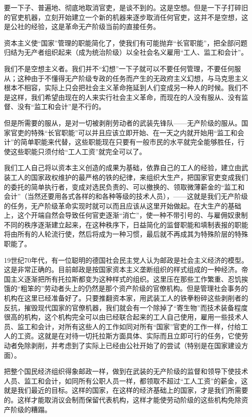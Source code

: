 \documentclass[UTF8, 12pt, a4paper]{ctexrep}
\begin{document}
要一下子、普遍地、彻底地取消官吏，是谈不到的。这是空想。但是一下子打碎旧的官吏机器，立刻开始建立一个新的机器来逐步取消任何官吏，这并不是空想，这是公社的经验，这是革命无产阶级当前的直接任务。

资本主义使“国家”管理的职能简化了，使我们有可能抛弃“长官职能”，把全部问题归结为无产者组织起来（成为统治阶级）以全社会名义雇用“工人、监工和会计”。

我们不是空想主义者。我们并不“幻想”一下子就可以不要任何管理，不要任何服从；这种由于不懂得无产阶级专政的任务而产生的无政府主义幻想，与马克思主义根本不相容，实际上只会把社会主义革命拖延到人们变成另一种人的时候。我们不是这样，我们希望由现在的人来实行社会主义革命，而现在的人没有服从、没有监督、没有“监工和会计”是不行的。

但是所需要的服从，是对一切被剥削劳动者的武装先锋队——无产阶级的服从。国家官吏的特殊“长官职能”可以并且应该立即开始、在一天之内就开始用“监工和会计”的简单职能来代替，这些职能现在只要有一般市民的水平就完全能够胜任，行使这些职能只须付给“工人工资”就完全可以了。

我们工人自己将以资本主义创造的成果为基础，依靠自己的工人的经验，建立由武装工人的国家政权维护的最严格的铁的纪律，来组织大生产，把国家官吏变成我们的委托的简单执行者，变成对选民负责的、可以撤换的、领取微薄薪金的“监工和会计”（当然还要用各式各样的和各种等级的技术人员），——这就是我们无产阶级的任务，无产阶级革命实现时就可以而且应该从这里开始做起。在大生产的基础上，这个开端自然会导致任何官吏逐渐“消亡”，使一种不带引号的、与雇佣奴隶制不同的秩序逐渐建立起来，在这种秩序下，日益简化的监督职能和填制表报的职能将由所有的人轮流行使，然后将成为一种习惯，最后就不再成其为特殊阶层的特殊职能了。

19世纪70年代，有一位聪明的德国社会民主党人认为邮政是社会主义经济的模型。这是非常正确的。目前邮政是按国家资本主义垄断组织的样式组成的一种经济。帝国主义逐渐把所有托拉斯都变为这种样式的组织。这里压在那些工作繁重、忍饥挨饿的“粗笨的”劳动者头上的仍然是那个资产阶级的官僚机构。但是管理社会事务的机构在这里已经准备好了。只要推翻资本家，用武装工人的铁拳粉碎这些剥削者的反抗，摧毁现代国家的官僚机器，我们就会有一个除掉了“寄生物”而技术装备程度很高的机构，这个机构完全可以由已经联合起来的工人自己使用，雇用一些技术人员、监工和会计，对所有这些人的工作如同对所有“国家”官吏的工作一样，付给工人的工资。这就是在对待一切托拉斯方面具体、实际而且立即可行的任务，它使劳动者免除剥削，并考虑到了实际上已经由公社开始了的尝试（特别是在国家建设方面）。

把整个国民经济组织得象邮政一样，做到在武装的无产阶级的监督和领导下使技术人员、监工和会计，如同所有公职人员一样，都领取不超过“工人工资”的薪金，这就是我们最近的目标。这样的国家，在这样的经济基础上的国家，才是我们所需要的。这样才能取消议会制而保留代表机构，这样才能使劳动阶级的这些机构免除资产阶级的糟蹋。
\end{document}

